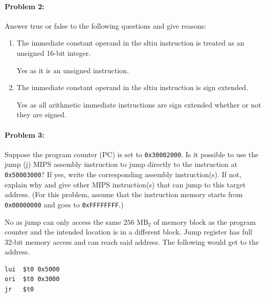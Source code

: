 \documentclass[12pt,letterpaper,titlepage]{article}
\begin{document}
\begin{raggedright}
\clearpage

\paragraph{Problem 2: }
Answer true or false to the following questions and give reasons: 
\begin{enumerate}
\item The immediate constant operand in the sltiu instruction is treated as an unsigned 16-bit integer. 

Yes as it is an unsigned instruction.

\item The immediate constant operand in the sltiu instruction is sign extended. 

Yes as all arithmetic immediate instructions are sign extended whether or not they are signed.

\end{enumerate}

\paragraph{Problem 3: } 
Suppose the program counter (PC) is set to \texttt{0x30002000}. Is it possible to use the jump (j) MIPS assembly instruction to jump directly to the instruction at \texttt{0x50003000}? If yes, write the corresponding assembly instruction(s). If not, explain why and give other MIPS instruction(s) that can jump to this target address. (For this problem, assume that the instruction memory starts from \texttt{0x00000000} and goes to \texttt{0xFFFFFFFF}.)

No as jump can only access the same $256\text{ MB}_2$ of memory block as the program counter and the intended location is in a different block. Jump register has full 32-bit memory access and can reach said address. The following would get to the address.

\begin{lstlisting}
lui  $t0 0x5000
ori  $t0 0x3000
jr   $t0
\end{lstlisting}


\end{raggedright}
\end{document}
